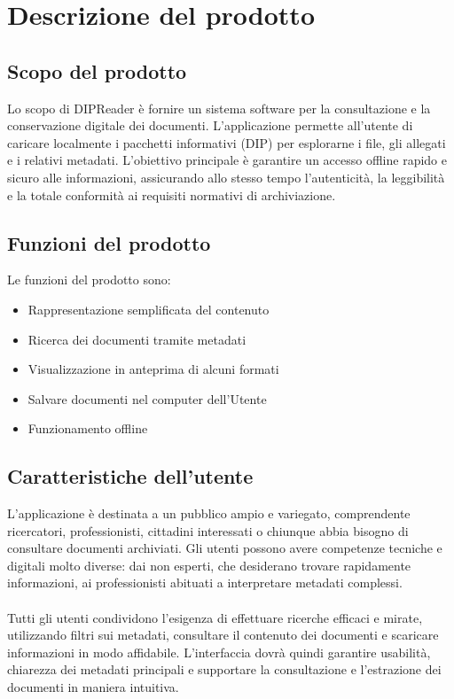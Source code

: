 \documentclass[a4paper,12pt]{article}
\begin{document}
    \section{Descrizione del prodotto} {
        \subsection{Scopo del prodotto} {
            Lo scopo di DIPReader è fornire un sistema software per la consultazione e la conservazione digitale dei documenti. L'applicazione permette all'utente di caricare localmente i pacchetti informativi (DIP) per esplorarne i file, gli allegati e i relativi metadati. L'obiettivo principale è garantire un accesso offline rapido e sicuro alle informazioni, assicurando allo stesso tempo l'autenticità, la leggibilità e la totale conformità ai requisiti normativi di archiviazione. }
        \subsection{Funzioni del prodotto} {
            Le funzioni del prodotto sono: 
            \begin{itemize}
                \item Rappresentazione semplificata del contenuto 
                \item Ricerca dei documenti tramite metadati
                \item Visualizzazione in anteprima di alcuni formati
                \item Salvare documenti nel computer dell'Utente
                \item Funzionamento offline
            \end{itemize}
        }
        \subsection{Caratteristiche dell'utente} {
            L’applicazione è destinata a un pubblico ampio e variegato, comprendente ricercatori, professionisti, cittadini interessati o chiunque abbia bisogno di consultare documenti archiviati. Gli utenti possono avere competenze tecniche e digitali molto diverse: dai non esperti, che desiderano trovare rapidamente informazioni, ai professionisti abituati a interpretare metadati complessi. \\
            \\
            Tutti gli utenti condividono l’esigenza di effettuare ricerche efficaci e mirate, utilizzando filtri sui metadati, consultare il contenuto dei documenti e scaricare informazioni in modo affidabile. L’interfaccia dovrà quindi garantire usabilità, chiarezza dei metadati principali e supportare la consultazione e l’estrazione dei documenti in maniera intuitiva.
        }

    }
    \newpage
\end{document}
